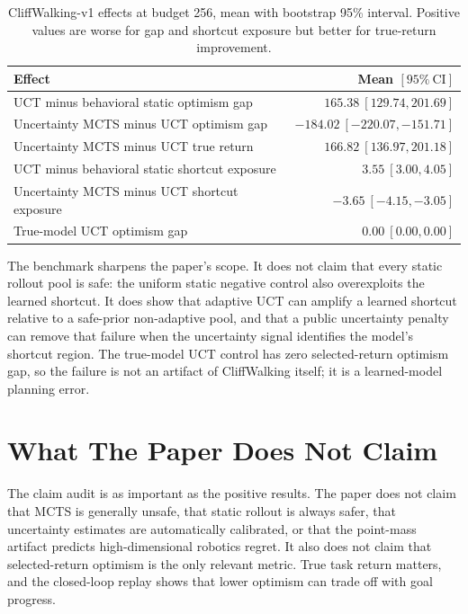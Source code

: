 \documentclass{article}
\begin{document}
\begin{table}[t]
\caption{CliffWalking-v1 effects at budget 256, mean with bootstrap 95\% interval. Positive values are worse for gap and shortcut exposure but better for true-return improvement.}
\label{tab:cliffwalking}
\begin{center}
\begin{tabular}{lr}
\toprule
Effect & Mean \([95\%\ \mathrm{CI}]\) \\
\midrule
UCT minus behavioral static optimism gap & \(165.38\ [129.74,201.69]\) \\
Uncertainty MCTS minus UCT optimism gap & \(-184.02\ [-220.07,-151.71]\) \\
Uncertainty MCTS minus UCT true return & \(166.82\ [136.97,201.18]\) \\
UCT minus behavioral static shortcut exposure & \(3.55\ [3.00,4.05]\) \\
Uncertainty MCTS minus UCT shortcut exposure & \(-3.65\ [-4.15,-3.05]\) \\
True-model UCT optimism gap & \(0.00\ [0.00,0.00]\) \\
\bottomrule
\end{tabular}
\end{center}
\end{table}

The benchmark sharpens the paper's scope. It does not claim that every static rollout pool is safe: the uniform static negative control also overexploits the learned shortcut. It does show that adaptive UCT can amplify a learned shortcut relative to a safe-prior non-adaptive pool, and that a public uncertainty penalty can remove that failure when the uncertainty signal identifies the model's shortcut region. The true-model UCT control has zero selected-return optimism gap, so the failure is not an artifact of CliffWalking itself; it is a learned-model planning error.

\section{What The Paper Does Not Claim}

The claim audit is as important as the positive results. The paper does not claim that MCTS is generally unsafe, that static rollout is always safer, that uncertainty estimates are automatically calibrated, or that the point-mass artifact predicts high-dimensional robotics regret. It also does not claim that selected-return optimism is the only relevant metric. True task return matters, and the closed-loop replay shows that lower optimism can trade off with goal progress.
\end{document}

